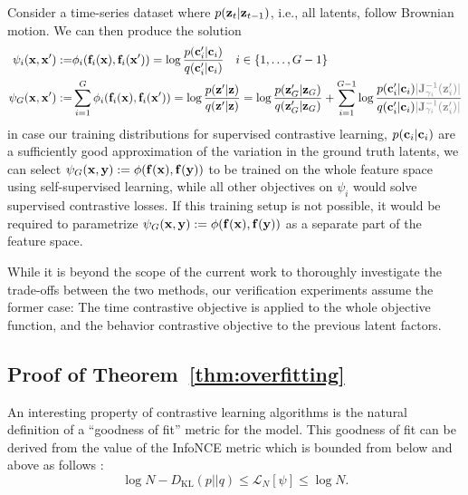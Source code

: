         Consider a time-series dataset where $p(\mathbf{z}_t | \mathbf{z}_{t-1})$, i.e., all latents, follow Brownian motion.
        We can then produce the solution
        \newcommand{\muteddetjac}{\textcolor{gray}{|\JJ^{-1}_{\gamma_i}(\zz'_i)|}}
        \begin{align}
            \psi_i(\xx, \xx') :=& \phi_i(\ff_i(\xx), \ff_i(\xx')) = \log \frac{p(\cc_i' | \cc_i)}{q(\cc_i' | \cc_i)} \quad i \in \{1,\dots,G-1\} \\
            \psi_G(\xx, \xx') :=& \sum_{i=1}^G \phi_i(\ff_i(\xx), \ff_i(\xx'))  
                = \log \frac{p(\zz' | \zz)}{q(\zz' | \zz)} 
                = \log \frac{p(\zz_G' | \zz_G)}{q(\zz_G' | \zz_G)} 
                   + \sum_{i=1}^{G-1} \log \frac{p(\cc'_i | \cc_i)\muteddetjac }{q(\cc'_i | \cc_i) \muteddetjac}
        \end{align}
        in case our training distributions for supervised contrastive learning, $p(\mathbf{c}_i | \mathbf{c}_i)$ are a sufficiently good approximation of the variation in the ground truth latents, we can select $\psi_G(\mathbf{x}, \mathbf{y}) := \phi(\mathbf{f}(\mathbf{x}), \mathbf{f}(\mathbf{y}))$ to be trained on the whole feature space using self-supervised learning, while all other objectives on $\psi_i$ would solve supervised contrastive losses. If this training setup is not possible, it would be required to parametrize $\psi_G(\mathbf{x}, \mathbf{y}) := \phi(\mathbf{f}(\mathbf{x}), \mathbf{f}(\mathbf{y}))$ as a separate part of the feature space.
    
        While it is beyond the scope of the current work to thoroughly investigate the trade-offs between the two methods, our verification experiments assume the former case: The time contrastive objective is applied to the whole objective function, and the behavior contrastive objective to the previous latent factors.


\subsection{Proof of Theorem~\ref{thm:overfitting}}\label{sec:proof-prop-overfitting}

    An interesting property of contrastive learning algorithms is the natural definition of a ``goodness of fit'' metric for the model. This goodness of fit can be derived from the value of the InfoNCE metric which is bounded from below and above as follows \citep{schneider2023cebra}:
    \begin{equation}
       \log N - D_\text{KL}(p || q) \le \mathcal{L}_N[\psi] \le \log N.
    \end{equation}

